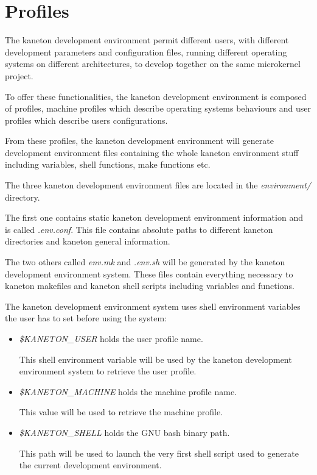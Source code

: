 \section{Profiles}

The kaneton development environment permit different users, with different
development parameters and configuration files, running different operating
systems on different architectures, to develop together on the same
microkernel project.

To offer these functionalities, the kaneton development environment is
composed of profiles, machine profiles which describe operating systems
behaviours and user profiles which describe users configurations.

From these profiles, the kaneton development environment will generate
development environment files containing the whole kaneton environment
stuff including variables, shell functions, make functions etc.

The three kaneton development environment files are located in the
\textit{environment/} directory.

The first one contains static kaneton development environment information
and is called \textit{.env.conf}. This file contains absolute paths
to different kaneton directories and kaneton general information.

The two others called \textit{env.mk} and \textit{.env.sh} will be generated
by the kaneton development environment system. These files contain
everything necessary to kaneton makefiles and kaneton shell scripts
including variables and functions.

The kaneton development environment system uses shell environment variables
the user has to set before using the system:

\begin{itemize}
  \item
    \textit{\$KANETON\_USER} holds the user profile name.

    This shell environment variable will be used by the kaneton development
    environment system to retrieve the user profile.
  \item
    \textit{\$KANETON\_MACHINE} holds the machine profile name.

    This value will be used to retrieve the machine profile.
  \item
    \textit{\$KANETON\_SHELL} holds the GNU bash binary path.

    This path will be used to launch the very first shell script used to
    generate the current development environment.
\end{itemize}

